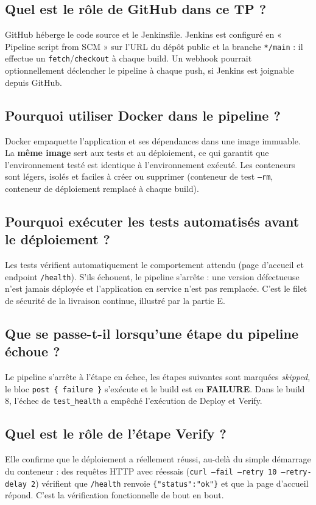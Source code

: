 \documentclass[11pt,a4paper]{article}
\newcommand{\failure}{\textcolor{failred}{\textbf{FAILURE}}}
\begin{document}
\subsection{Quel est le rôle de GitHub dans ce TP ?}
GitHub héberge le code source et le Jenkinsfile. Jenkins est configuré en « Pipeline
script from SCM » sur l'URL du dépôt public et la branche \texttt{*/main} : il effectue
un \texttt{fetch}/\texttt{checkout} à chaque build. Un webhook pourrait optionnellement
déclencher le pipeline à chaque push, si Jenkins est joignable depuis GitHub.

\subsection{Pourquoi utiliser Docker dans le pipeline ?}
Docker empaquette l'application et ses dépendances dans une image immuable. La
\textbf{même image} sert aux tests et au déploiement, ce qui garantit que l'environnement
testé est identique à l'environnement exécuté. Les conteneurs sont légers, isolés et
faciles à créer ou supprimer (conteneur de test \texttt{--rm}, conteneur de déploiement
remplacé à chaque build).

\subsection{Pourquoi exécuter les tests automatisés avant le déploiement ?}
Les tests vérifient automatiquement le comportement attendu (page d'accueil et endpoint
\texttt{/health}). S'ils échouent, le pipeline s'arrête : une version défectueuse n'est
jamais déployée et l'application en service n'est pas remplacée. C'est le filet de
sécurité de la livraison continue, illustré par la partie E.

\subsection{Que se passe-t-il lorsqu'une étape du pipeline échoue ?}
Le pipeline s'arrête à l'étape en échec, les étapes suivantes sont marquées
\emph{skipped}, le bloc \texttt{post \{ failure \}} s'exécute et le build est en
\failure{}. Dans le build 8, l'échec de \texttt{test\_health} a empêché l'exécution de
Deploy et Verify.

\subsection{Quel est le rôle de l'étape Verify ?}
Elle confirme que le déploiement a réellement réussi, au-delà du simple démarrage du
conteneur : des requêtes HTTP avec réessais (\texttt{curl --fail --retry 10
--retry-delay 2}) vérifient que \texttt{/health} renvoie \texttt{\{"status":"ok"\}} et que
la page d'accueil répond. C'est la vérification fonctionnelle de bout en bout.
\end{document}
